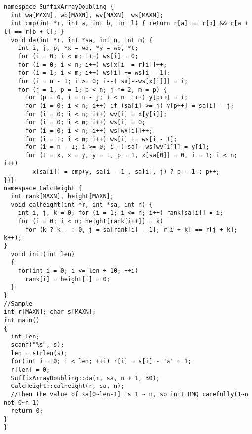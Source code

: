 \begin{lstlisting}
namespace SuffixArrayDoubling {
  int wa[MAXN], wb[MAXN], wv[MAXN], ws[MAXN];
  int cmp(int *r, int a, int b, int l) { return r[a] == r[b] && r[a + l] == r[b + l]; }
  void da(int *r, int *sa, int n, int m) {
    int i, j, p, *x = wa, *y = wb, *t; 
    for (i = 0; i < m; i++) ws[i] = 0;
    for (i = 0; i < n; i++) ws[x[i] = r[i]]++;
    for (i = 1; i < m; i++) ws[i] += ws[i - 1];
    for (i = n - 1; i >= 0; i--) sa[--ws[x[i]]] = i;
    for (j = 1, p = 1; p < n; j *= 2, m = p) {
      for (p = 0, i = n - j; i < n; i++) y[p++] = i;
      for (i = 0; i < n; i++) if (sa[i] >= j) y[p++] = sa[i] - j;
      for (i = 0; i < n; i++) wv[i] = x[y[i]];
      for (i = 0; i < m; i++) ws[i] = 0;
      for (i = 0; i < n; i++) ws[wv[i]]++;
      for (i = 1; i < m; i++) ws[i] += ws[i - 1];
      for (i = n - 1; i >= 0; i--) sa[--ws[wv[i]]] = y[i];
      for (t = x, x = y, y = t, p = 1, x[sa[0]] = 0, i = 1; i < n; i++)
        x[sa[i]] = cmp(y, sa[i - 1], sa[i], j) ? p - 1 : p++;
}}}
namespace CalcHeight {
  int rank[MAXN], height[MAXN];
  void calheight(int *r, int *sa, int n) { 
    int i, j, k = 0; for (i = 1; i <= n; i++) rank[sa[i]] = i;
    for (i = 0; i < n; height[rank[i++]] = k)
      for (k ? k-- : 0, j = sa[rank[i] - 1]; r[i + k] == r[j + k]; k++);
}
  void init(int len)
  {
    for(int i = 0; i <= len + 10; ++i)
      rank[i] = height[i] = 0;
  }
}
//Sample
int r[MAXN]; char s[MAXN];
int main()
{
  int len;
  scanf("%s", s);
  len = strlen(s);
  for(int i = 0; i < len; ++i) r[i] = s[i] - 'a' + 1;
  r[len] = 0;
  SuffixArrayDoubling::da(r, sa, n + 1, 30);
  CalcHeight::calheight(r, sa, n);
  //Then the value of sa[0~len-1] is 1 ~ n, so init RMQ carefully(1~n not 0~n-1)
  return 0;
}
}

\end{lstlisting}